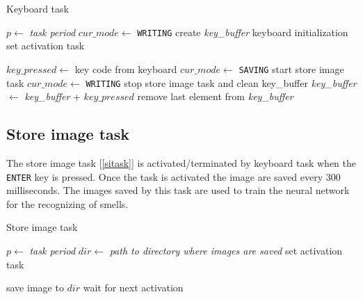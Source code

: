 \documentclass[12pt]{article}
\begin{document}
\begin{algorithm}[t]
\caption{Keyboard task}
\label{ktask}

\begin{algorithmic}
\State $p\gets$ \textit{task period}
\State $cur\_mode\gets$ \texttt{WRITING}
\State create \textit{key\_buffer}
\State keyboard initialization
\State set activation task

\Repeat
\State $key\_pressed\gets$ key code from keyboard
    \State $cur\_mode\gets$ \texttt{SAVING}
    \State start store image task
    \Else
    \State $cur\_mode\gets$ \texttt{WRITING}
    \State stop store image task and clean key\_buffer
    \EndIf
{}
        \State \textit{key\_buffer} $\gets$ \textit{key\_buffer} + $key\_pressed$ 
        \State remove last element from \textit{key\_buffer}
    \EndIf
\EndIf


\end{algorithmic}
\end{algorithm}

\subsection{Store image task}
The store image task [\ref{sitask}] is activated/terminated by keyboard task
when the \texttt{ENTER} key is pressed. Once the task is activated the image
are saved every $300$ milliseconds. The images saved by this task are used to
train the neural network for the recognizing of smells.

\begin{algorithm}[t]
\caption{Store image task}
\label{sitask}

\begin{algorithmic}
\State $p\gets$ \textit{task period}
\State $dir\gets$ \textit{path to directory where images are saved}
\State set activation task

\Loop
\State save image to $dir$
\State wait for next activation
\EndLoop

\end{algorithmic}
\end{algorithm}
\end{document}
